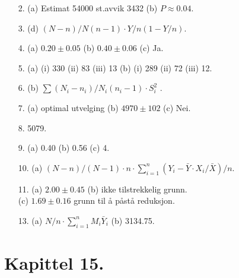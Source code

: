 \begin{itemize}
\item[2.]  (a) Estimat 54000 st.avvik 3432   (b) $P\approx 0.04$.
\item[3.]  (d) $(N-n)/N(n-1)\cdot Y/n(1-Y/n)$.
\item[4.]  (a) $0.20 \pm 0.05$   (b) $0.40 \pm 0.06$   (c) Ja.
\item[5.]  (a) (i) 330  (ii) 83  (iii) 13   (b) (i) 289  (ii) 72
              (iii) 12.
\item[6.]  (b) $\sum (N_i - n_i )/N_i (n_i - 1)\cdot S_i^2$ .
\item[7.]  (a) optimal utvelging   (b) $4970 \pm 102$   (c) Nei.
\item[8.]  5079.
\item[9.]  (a) 0.40   (b) 0.56   (c) 4.
\item[10.]  (a) $(N-n)/(N-1)\cdot n \cdot 
                \sum _{i=1}^n(Y_i -\bar{Y}\cdot X_i /\bar{X})/n$.
\item[11.]  (a) $2.00 \pm 0.45$   (b) ikke tilstrekkelig grunn.\\
            (c) $1.69 \pm 0.16$  grunn til å påstå reduksjon.
\item[13.]  (a) $N/n\cdot \sum _{i=1}^n M_i \bar{Y}_i$    (b) 3134.75.
\end{itemize}
                                                      
         
\section*{Kapittel 15.}

